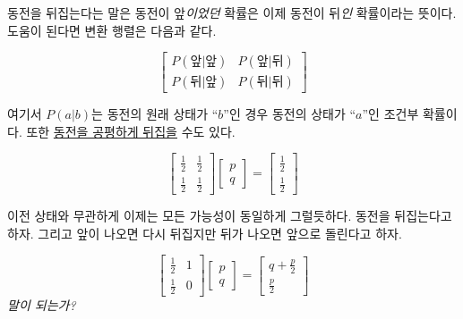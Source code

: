 \documentclass[a4paper,chapter,atbegshi,hidelinks]{oblivoir}
\begin{document}
동전을 뒤집는다는 말은 동전이 앞\emph{이었던} 확률은 이제 동전이 뒤\emph{인}
확률이라는 뜻이다. 도움이 된다면 변환 행렬은 다음과 같다.

\begin{equation}
  \begin{bmatrix}
    P(\textrm{앞}|\textrm{앞}) &P(\textrm{앞}|\textrm{뒤}) \\
    P(\textrm{뒤}|\textrm{앞}) &P(\textrm{뒤}|\textrm{뒤})
  \end{bmatrix}
\end{equation}

여기서 $P(a|b)$는 동전의 원래 상태가 ``$b$''인 경우 동전의 상태가 ``$a$''인 조건부 확률이다. 또한 \underline{동전을 공평하게 뒤집을} 수도 있다.

\begin{equation}
  \begin{bmatrix}
    \frac{1}{2} & \frac{1}{2} \\
    \frac{1}{2} & \frac{1}{2}
  \end{bmatrix}
  \begin{bmatrix}p\\q\end{bmatrix} =
  \begin{bmatrix}\frac{1}{2}\\\frac{1}{2}\end{bmatrix}
\end{equation}

이전 상태와 무관하게 이제는 모든 가능성이 동일하게 그럴듯하다. 동전을 뒤집는다고
하자. 그리고 앞이 나오면 다시 뒤집지만 뒤가 나오면 앞으로 돌린다고 하자.

\begin{equation}
  \begin{bmatrix}
    \frac{1}{2} & 1 \\ \frac{1}{2} & 0
  \end{bmatrix}
  \begin{bmatrix} p \\ q \end{bmatrix} = 
  \begin{bmatrix} q+\frac{p}{2} \\ \frac{p}{2} \end{bmatrix}
\end{equation}
\emph{말이 되는가?} 
\end{document}
